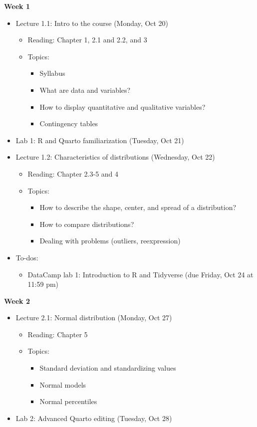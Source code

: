 \documentclass[11pt]{article}
\begin{document}
\large \textbf{Week 1}
\begin{itemize}
    \item Lecture 1.1: Intro to the course (Monday, Oct 20)
    \begin{itemize}
        \item Reading: Chapter 1, 2.1 and 2.2, and 3
        \item Topics:
        \begin{itemize}
            \item Syllabus
            \item What are data and variables?
            \item How to display quantitative and qualitative variables?
            \item Contingency tables
        \end{itemize}
    \end{itemize}
    \item Lab 1: R and Quarto familiarization (Tuesday, Oct 21)
    \item Lecture 1.2: Characteristics of distributions (Wednesday, Oct 22)
    \begin{itemize}
        \item Reading: Chapter 2.3-5 and 4
        \item Topics:
        \begin{itemize}
            \item How to describe the shape, center, and spread of a distribution?
            \item How to compare distributions?
            \item Dealing with problems (outliers, reexpression)
        \end{itemize}
    \end{itemize}
    \item To-dos: 
    \begin{itemize}
        \item DataCamp lab 1: Introduction to R and Tidyverse (due Friday, Oct 24 at 11:59 pm)
    \end{itemize}
\end{itemize}



\textbf{Week 2}
\begin{itemize}
    \item Lecture 2.1: Normal distribution (Monday, Oct 27)
    \begin{itemize}
        \item Reading: Chapter 5
        \item Topics: 
        \begin{itemize}
            \item Standard deviation and standardizing values
            \item Normal models
            \item Normal percentiles
        \end{itemize}
    \end{itemize}
    \item Lab 2: Advanced Quarto editing (Tuesday, Oct 28)
\end{itemize}
\end{document}
